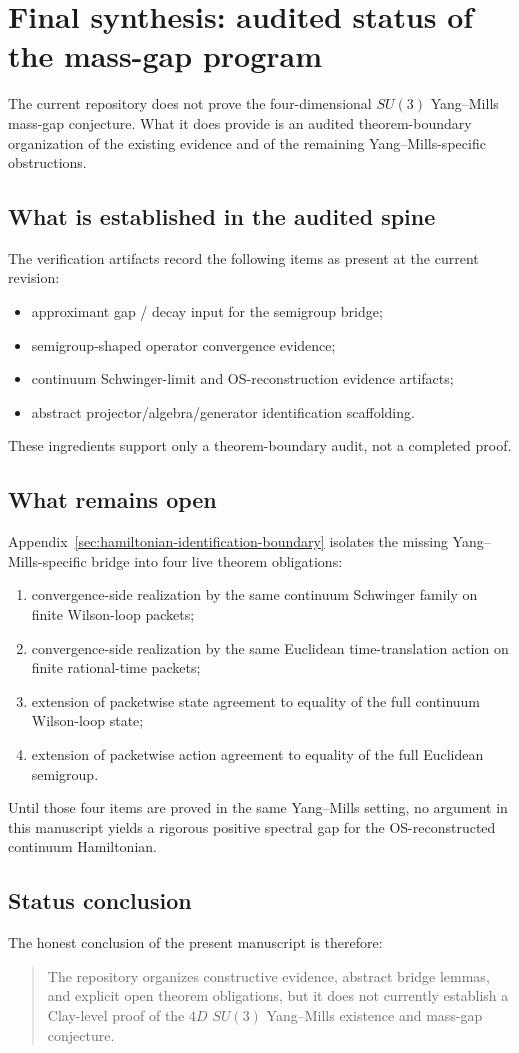 \section{Final synthesis: audited status of the mass-gap program}
\label{app:mass_gap_synthesis}

The current repository does not prove the four-dimensional $SU(3)$ Yang--Mills
mass-gap conjecture. What it does provide is an audited theorem-boundary
organization of the existing evidence and of the remaining Yang--Mills-specific
obstructions.

\subsection{What is established in the audited spine}
The verification artifacts record the following items as present at the current
revision:
\begin{itemize}
\item approximant gap / decay input for the semigroup bridge;
\item semigroup-shaped operator convergence evidence;
\item continuum Schwinger-limit and OS-reconstruction evidence artifacts;
\item abstract projector/algebra/generator identification scaffolding.
\end{itemize}
These ingredients support only a theorem-boundary audit, not a completed proof.

\subsection{What remains open}
Appendix~\ref{sec:hamiltonian-identification-boundary} isolates the missing
Yang--Mills-specific bridge into four live theorem obligations:
\begin{enumerate}
\item convergence-side realization by the same continuum Schwinger family on
finite Wilson-loop packets;
\item convergence-side realization by the same Euclidean time-translation
action on finite rational-time packets;
\item extension of packetwise state agreement to equality of the full
continuum Wilson-loop state;
\item extension of packetwise action agreement to equality of the full
Euclidean semigroup.
\end{enumerate}
Until those four items are proved in the same Yang--Mills setting, no argument
in this manuscript yields a rigorous positive spectral gap for the
OS-reconstructed continuum Hamiltonian.

\subsection{Status conclusion}
The honest conclusion of the present manuscript is therefore:
\begin{quote}
The repository organizes constructive evidence, abstract bridge lemmas, and
explicit open theorem obligations, but it does not currently establish a
Clay-level proof of the $4D$ $SU(3)$ Yang--Mills existence and mass-gap
conjecture.
\end{quote}
\endinput
